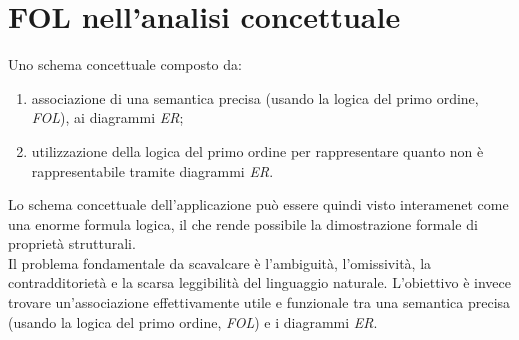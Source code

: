 \section{FOL nell'analisi concettuale}
Uno schema concettuale composto da:
\begin{enumerate}
	\item associazione di una semantica precisa (usando la logica del primo ordine, \textit{FOL}), ai diagrammi \textit{ER};
	\item utilizzazione della logica del primo ordine per rappresentare quanto non è rappresentabile tramite diagrammi \textit{ER}.
\end{enumerate}
Lo schema concettuale dell'applicazione può essere quindi visto interamenet come una enorme formula logica, il che rende possibile la dimostrazione formale di proprietà strutturali. \\
Il problema fondamentale da scavalcare è l'ambiguità, l'omissività, la contradditorietà e la scarsa leggibilità del linguaggio naturale. L'obiettivo è invece trovare un'associazione effettivamente utile e funzionale tra una semantica precisa (usando la logica del primo ordine, \textit{FOL}) e i diagrammi \textit{ER}.

